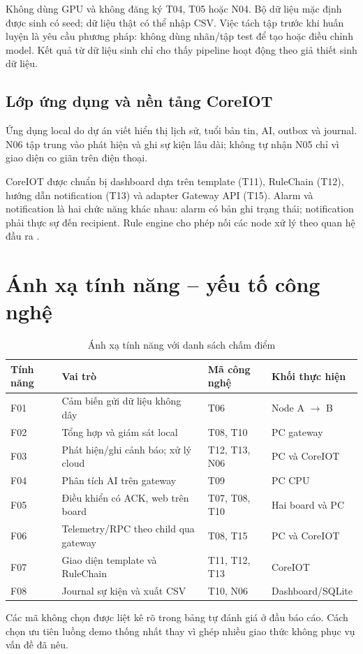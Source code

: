 Không dùng GPU và không đăng ký T04, T05 hoặc N04. Bộ dữ liệu mặc định được sinh có seed; dữ liệu thật có thể nhập CSV. Việc tách tập trước khi huấn luyện là yêu cầu phương pháp: không dùng nhãn/tập test để tạo hoặc điều chỉnh model. Kết quả từ dữ liệu sinh chỉ cho thấy pipeline hoạt động theo giả thiết sinh dữ liệu.

\subsection{Lớp ứng dụng và nền tảng CoreIOT}
Ứng dụng local do dự án viết hiển thị lịch sử, tuổi bản tin, AI, outbox và journal. N06 tập trung vào phát hiện và ghi sự kiện lâu dài; không tự nhận N05 chỉ vì giao diện co giãn trên điện thoại.

CoreIOT được chuẩn bị dashboard dựa trên template (T11), RuleChain (T12), hướng dẫn notification (T13) và adapter Gateway API (T15). Alarm và notification là hai chức năng khác nhau: alarm có bản ghi trạng thái; notification phải thực sự đến recipient. Rule engine cho phép nối các node xử lý theo quan hệ đầu ra \cite{ruleengine}.

\section{Ánh xạ tính năng -- yếu tố công nghệ}
\begin{table}[H]\centering\small
\caption{Ánh xạ tính năng với danh sách chấm điểm}
\begin{tabular}{P{1.1cm}P{5.8cm}P{3.3cm}P{4.3cm}}
\toprule Tính năng & Vai trò & Mã công nghệ & Khối thực hiện \\ \midrule
F01 & Cảm biến gửi dữ liệu không dây & T06 & Node A $\rightarrow$ B \\
F02 & Tổng hợp và giám sát local & T08, T10 & PC gateway \\
F03 & Phát hiện/ghi cảnh báo; xử lý cloud & T12, T13, N06 & PC và CoreIOT \\
F04 & Phân tích AI trên gateway & T09 & PC CPU \\
F05 & Điều khiển có ACK, web trên board & T07, T08, T10 & Hai board và PC \\
F06 & Telemetry/RPC theo child qua gateway & T08, T15 & PC và CoreIOT \\
F07 & Giao diện template và RuleChain & T11, T12, T13 & CoreIOT \\
F08 & Journal sự kiện và xuất CSV & T10, N06 & Dashboard/SQLite \\
\bottomrule
\end{tabular}
\end{table}
Các mã không chọn được liệt kê rõ trong bảng tự đánh giá ở đầu báo cáo. Cách chọn ưu tiên luồng demo thống nhất thay vì ghép nhiều giao thức không phục vụ vấn đề đã nêu.

